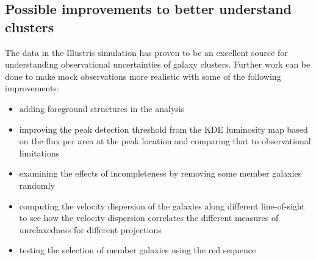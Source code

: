  
\subsection{Possible improvements to better understand clusters}
The data in the Illustris simulation has proven to be an excellent source for
understanding observational uncertainties of galaxy clusters.
Further work can be done to make mock observations more realistic with some of
the following improvements:
\begin{itemize}
		\item adding foreground structures in the analysis 
		\item improving the peak detection threshold from the KDE luminosity map based on
			the flux per area at the peak location and comparing that to observational
			limitations
		\item examining the effects of incompleteness by removing some member galaxies randomly 
		\item computing the velocity dispersion of the galaxies along different
			line-of-sight to see how the velocity dispersion correlates the different
			measures of unrelaxedness for different projections
		\item testing the selection of member galaxies using the red sequence
	\end{itemize}


